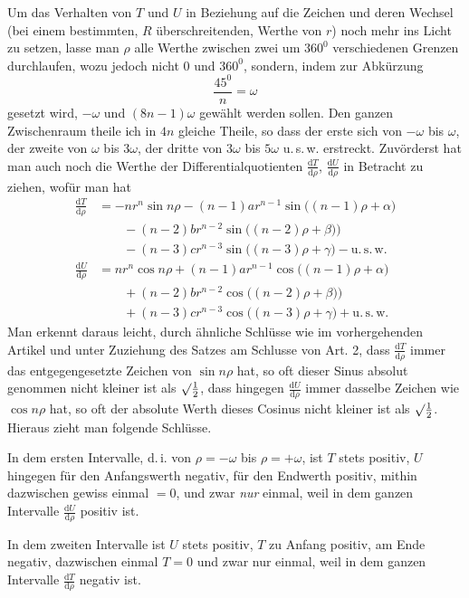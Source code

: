 Um das Verhalten von $T$ und $U$ in Beziehung auf die Zeichen und deren
Wechsel (bei einem bestimmten, $R$ überschreitenden, Werthe von $r$) noch mehr
ins Licht zu setzen, lasse man $\rho$ alle Werthe zwischen zwei um $360^0$ verschiedenen Grenzen durchlaufen, wozu jedoch nicht $0$ und $360^0$, sondern, indem zur
Abkürzung
\[
\frac{45^0}{n}=\omega
\]
gesetzt wird, $-\omega$ und $(8n-1)\omega$ gewählt werden sollen. Den ganzen Zwischenraum theile ich in $4n$ gleiche Theile, so dass der erste sich von $-\omega$ bis $\omega$,
der zweite von $\omega$ bis $3\omega$, der dritte von $3\omega$ bis $5\omega$ u.\,s.\,w. erstreckt. Zuvörderst hat man auch noch die Werthe der Differentialquotienten $\frac{\mathrm{d}T}{\mathrm{d}\rho}$, $\frac{\mathrm{d}U}{\mathrm{d}\rho}$ in Betracht zu ziehen, wofür man hat
\[
\begin{array}{rl}
\frac{\mathrm{d}T}{\mathrm{d}\rho}
&=-nr^n\sin n\rho-(n-1)ar^{n-1}\sin\bigl((n-1)\rho+\alpha\bigr)\\
&\qquad -(n-2)br^{n-2}\sin\bigl((n-2)\rho+\beta)\bigr)\\
&\qquad -(n-3)cr^{n-3}\sin\bigl((n-3)\rho+\gamma\bigr)-\mathrm{u.\,s.\,w.}\\
\frac{\mathrm{d}U}{\mathrm{d}\rho}
&=nr^n\cos n\rho+(n-1)ar^{n-1}\cos\bigl((n-1)\rho+\alpha\bigr)\\
&\qquad +(n-2)br^{n-2}\cos\bigl((n-2)\rho+\beta)\bigr)\\
&\qquad +(n-3)cr^{n-3}\cos\bigl((n-3)\rho+\gamma\bigr)+\mathrm{u.\,s.\,w.}
\end{array}
\]
Man erkennt daraus leicht, durch ähnliche Schlüsse wie im vorhergehenden Artikel und unter Zuziehung des Satzes am Schlusse von Art. 2, dass $\frac{\mathrm{d}T}{\mathrm{d}\rho}$ immer
das entgegengesetzte Zeichen von $\sin n\rho$ hat, so oft dieser Sinus absolut genommen nicht kleiner ist als $\surd\frac{1}{2}$, dass hingegen $\frac{\mathrm{d}U}{\mathrm{d}\rho}$ immer dasselbe Zeichen wie
$\cos n\rho$ hat, so oft der absolute Werth dieses Cosinus nicht kleiner ist als $\surd\frac{1}{2}$.
Hieraus zieht man folgende Schlüsse.

In dem ersten Intervalle, d.\,i. von $\rho=-\omega$ bis $\rho=+\omega$, ist $T$ stets
positiv, $U$ hingegen für den Anfangswerth negativ, für den Endwerth positiv,
mithin dazwischen gewiss einmal $=0$, und zwar \emph{nur} einmal, weil in dem ganzen Intervalle $\frac{\mathrm{d}U}{\mathrm{d}\rho}$ positiv ist.

In dem zweiten Intervalle ist $U$ stets positiv, $T$ zu Anfang positiv, am
Ende negativ, dazwischen einmal $T=0$ und zwar nur einmal, weil in dem
ganzen Intervalle $\frac{\mathrm{d}T}{\mathrm{d}\rho}$ negativ ist.

